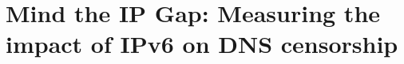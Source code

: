 


% 



\renewcommand{\sectionautorefname}{\S}
\renewcommand{\subsectionautorefname}{\S}
\renewcommand{\subsubsectionautorefname}{\S}

\chapter{Mind the IP Gap: Measuring the impact of IPv6 on DNS censorship}



%  



















% 
% 

% 

% 
